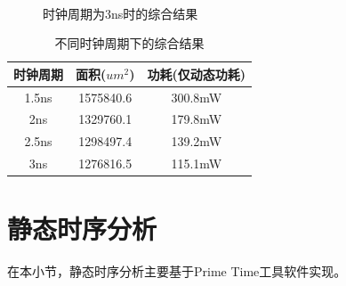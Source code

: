 \documentclass[a4paper,12pt]{report}
\begin{document}
\begin{figure}[!hbtp]
\centering
{}
\\
\caption{时钟周期为3ns时的综合结果}
\label{figure3.6}
\end{figure}
\begin{table}[!hbtp]
\centering
\label{table2}
\caption{不同时钟周期下的综合结果}
\begin{tabular}{ccc}
\toprule
时钟周期  &  面积($um^2$)      &    功耗(仅动态功耗)   \\ 
\midrule
1.5ns    &  1575840.6 & 300.8mW  \\
2ns      &  1329760.1 & 179.8mW  \\
2.5ns    &  1298497.4 & 139.2mW  \\
3ns      &  1276816.5 & 115.1mW  \\
\bottomrule
\end{tabular}
\end{table}
\section{静态时序分析}
在本小节，静态时序分析主要基于Prime Time工具软件实现。
\end{document}
